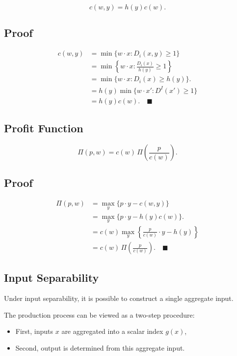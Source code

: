 \[
c(w,y)=h(y)c(w).
\]

\subsection*{Proof}

\[
\begin{aligned}
c(w,y)
&=
\min \{w\cdot x : D_i(x,y)\ge 1\}\\
&=
\min \left\{w\cdot x : \frac{D_i(x)}{h(y)} \ge 1 \right\}\\
&=
\min \{w\cdot x : D_i(x)\ge h(y)\}.\\
&=
h(y)\min \{w\cdot x' : D^I(x')\ge 1\}\\
&=
h(y)c(w).
\quad \blacksquare
\end{aligned}
\]



\subsection*{Profit Function}

\[
\Pi(p,w)=c(w)\,\Pi\!\left(\frac{p}{c(w)}\right).
\]

\subsection*{Proof}

\[
\begin{aligned}
\Pi(p,w)
&=
\max_y \{p\cdot y - c(w,y)\}\\
&=
\max_y \{p\cdot y - h(y)c(w)\}.\\
&=
c(w)\max_y \left\{ \frac{p}{c(w)}\cdot y - h(y) \right\}\\
&=
c(w)\,\Pi\!\left(\frac{p}{c(w)}\right).
\quad \blacksquare
\end{aligned}
\]



\subsection{Input Separability}

Under input separability, it is possible to construct a single aggregate input.

The production process can be viewed as a two-step procedure:
\begin{itemize}
    \item First, inputs $x$ are aggregated into a scalar index $g(x)$,
    \item Second, output is determined from this aggregate input.
\end{itemize}

